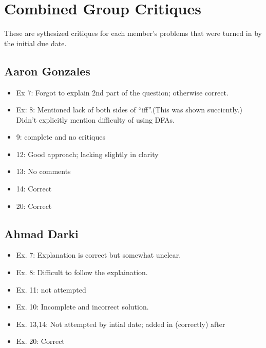 \documentclass[titlepage]{article}\usepackage[]{graphicx}\usepackage[]{color}
\begin{document}
\section*{Combined Group Critiques}
These are sythesized critiques for each member's problems that were turned in
by the initial due date.
\subsection{Aaron Gonzales}
\begin{itemize}
	\item Ex 7: Forgot to explain 2nd part of the question; otherwise correct.
	\item Ex: 8: Mentioned lack of both sides of ``iff''.(This was shown
		succicntly.) Didn't explicitly mention difficulty of using DFAs.
	\item 9: complete and no critiques
	\item 12: Good approach; lacking slightly in clarity
	\item 13: No comments
	\item 14: Correct
	\item 20: Correct
\end{itemize}
\subsection{Ahmad Darki}

	\begin{itemize}
		\item Ex. 7: Explanation is correct but somewhat unclear.
    \item Ex. 8: Difficult to follow the explaination.
    \item Ex. 11: not attempted
		\item Ex. 10: Incomplete and incorrect solution.
    \item Ex. 13,14: Not attempted by intial date; added in (correctly) after
      \item Ex. 20: Correct
	\end{itemize}
\end{document}
